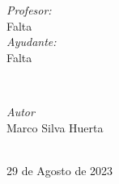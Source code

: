 \begin{titlepage}
\vspace{10mm}
\begin{minipage}{0.7\textwidth}
    \begin{flushleft} \large
        \emph{Profesor:}\\
            Falta\\
            \vspace{3mm}
            \emph{Ayudante:}\\
            Falta
    \end{flushleft}
\end{minipage}
\\
\vspace{20mm}
\begin{minipage}{0.4\textwidth}
    \begin{flushright} \large
    \centering
        \emph{Autor} \\ %
        \vspace{3mm}
        Marco Silva Huerta\\
    \end{flushright}
\end{minipage}\\[2.6cm]
\makeatother
{\large 29 de Agosto de 2023}\\[2cm]
\vfill 
\end{titlepage}